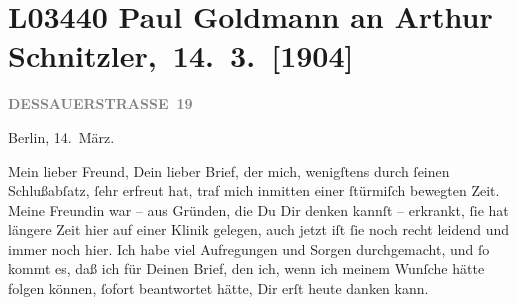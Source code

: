 

\section[ Paul Goldmann an Arthur Schnitzler, 14. 3. {[}1904{]}]{L03440 Paul Goldmann an Arthur Schnitzler, 14. 3. {[}1904{]}}
\nopagebreak{}
\rehead{ }\normalsize\beginnumbering{}
\toendnotes[C]{\smallbreak\pagebreak[2]}
\toendnotes[C]{\smallbreak}
\pstart
           \raggedleft{}{\pb}\textcolor{gray}{\textbf{DESSAUERSTRASSE 19}}\pend
           
\pstart
           Berlin, 14. März.\pend
           
\pstart{}Mein lieber Freund,\pend\vspace{0.5em}
\pstart
           Dein lieber Brief, der mich, wenigſtens durch ſeinen Schlußabſatz, ſehr erfreut hat,
               traf mich inmitten einer ſtürmiſch  bewegten Zeit.
               Meine Freundin war – aus
               Gründen, die Du Dir denken kannſt – erkrankt,  ſie
               hat längere Zeit hier auf einer
               Klinik gelegen, auch jetzt iſt ſie noch recht leidend und immer noch hier. Ich habe
               viel Aufregungen und Sorgen durchgemacht, und ſo kommt es, daß ich \introOben{}für\introOben{} Deinen Brief, den ich, wenn ich meinem Wunſche hätte \strikeout{\textcolor{gray}{erf}} folgen können, ſofort beantwortet hätte, Dir erſt heute danken kann.\pend
           

